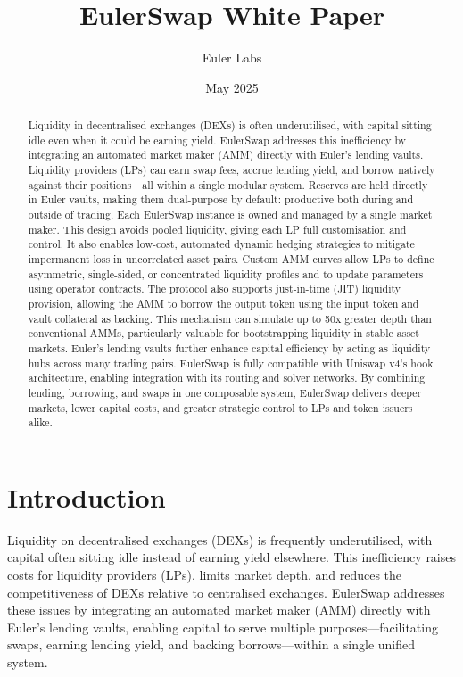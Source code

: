 \documentclass{article}
\title{EulerSwap White Paper}
\author{Euler Labs}
\date{May 2025}
\begin{document}
\maketitle

\pagestyle{plain}

\begin{abstract}
Liquidity in decentralised exchanges (DEXs) is often underutilised, with capital sitting idle even when it could be earning yield. EulerSwap addresses this inefficiency by integrating an automated market maker (AMM) directly with Euler’s lending vaults. Liquidity providers (LPs) can earn swap fees, accrue lending yield, and borrow natively against their positions—all within a single modular system. Reserves are held directly in Euler vaults, making them dual-purpose by default: productive both during and outside of trading. Each EulerSwap instance is owned and managed by a single market maker. This design avoids pooled liquidity, giving each LP full customisation and control. It also enables low-cost, automated dynamic hedging strategies to mitigate impermanent loss in uncorrelated asset pairs. Custom AMM curves allow LPs to define asymmetric, single-sided, or concentrated liquidity profiles and to update parameters using operator contracts. The protocol also supports just-in-time (JIT) liquidity provision, allowing the AMM to borrow the output token using the input token and vault collateral as backing. This mechanism can simulate up to 50x greater depth than conventional AMMs, particularly valuable for bootstrapping liquidity in stable asset markets. Euler's lending vaults further enhance capital efficiency by acting as liquidity hubs across many trading pairs. EulerSwap is fully compatible with Uniswap v4’s hook architecture, enabling integration with its routing and solver networks. By combining lending, borrowing, and swaps in one composable system, EulerSwap delivers deeper markets, lower capital costs, and greater strategic control to LPs and token issuers alike.
\end{abstract}

\section{Introduction}

Liquidity on decentralised exchanges (DEXs) is frequently underutilised, with capital often sitting idle instead of earning yield elsewhere. This inefficiency raises costs for liquidity providers (LPs), limits market depth, and reduces the competitiveness of DEXs relative to centralised exchanges. EulerSwap addresses these issues by integrating an automated market maker (AMM) directly with Euler’s lending vaults, enabling capital to serve multiple purposes—facilitating swaps, earning lending yield, and backing borrows—within a single unified system.
\end{document}
